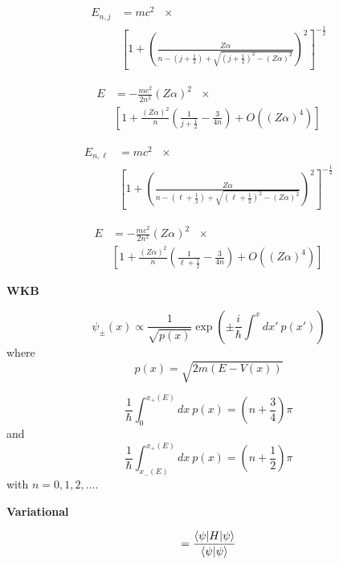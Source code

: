 \documentclass[11pt]{article}
\begin{document}
\begin{multicols}{2}
\begin{align}
  E_{n,j} & = mc^2 \:\:\: \times \nonumber \\
    & \left[1 +
    \left(
    \frac{Z\alpha}{
      n - (j+\frac{1}{2}) + \sqrt{(j+\frac{1}{2})^2 - (Z\alpha)^2}
      }
    \right)^2
    \right]^{-\frac{1}{2}}
\end{align}

\begin{align}
  E & = - \frac{mc^2}{2n^2} (Z\alpha)^2 \:\:\: \times \nonumber \\
  & \left[ 1 + \frac{(Z\alpha)^2}{n}
  \left( \frac{1}{j+\frac{1}{2}} - \frac{3}{4n}
  \right)
  +O((Z\alpha)^4) \right]
\end{align}


\begin{align}
  E_{n,\ell} & = mc^2 \:\:\: \times \nonumber \\
    & \left[1 +
    \left(
    \frac{Z\alpha}{
      n - (\ell+\frac{1}{2}) + \sqrt{(\ell+\frac{1}{2})^2 - (Z\alpha)^2}
      }
    \right)^2
    \right]^{-\frac{1}{2}}
\end{align}

\begin{align}
  E & = - \frac{mc^2}{2n^2} (Z\alpha)^2 \:\:\: \times \nonumber \\
  & \left[ 1 + \frac{(Z\alpha)^2}{n}
  \left( \frac{1}{\ell+\frac{1}{2}} - \frac{3}{4n}
  \right)
  +O((Z\alpha)^4) \right]
\end{align}

{\bf WKB}

\begin{equation}
\psi_{\pm} (x) \propto \frac{1}{\sqrt{p(x)}}
  \exp(\pm \frac{i}{\hbar} \int^{x} dx' \: p(x'))
\end{equation}
where
\begin{equation}
p(x) = \sqrt{2 m (E-V(x))}
\end{equation}

\begin{equation}
\frac{1}{\hbar} \int_0^{x_+(E)} dx \: p(x) =
\left(n + \frac{3}{4} \right) \pi
\end{equation}
and
\begin{equation}
\frac{1}{\hbar} \int_{x_-(E)}^{x_+(E)} dx \: p(x) =
\left(n + \frac{1}{2} \right) \pi
\end{equation}
with $n=0,1,2,\ldots$.

{\bf Variational}

\begin{equation}
[ E ] = \frac{\braket{\psi|H|\psi}}{\braket{\psi|\psi}}
\end{equation}


\end{multicols}
\end{document}
